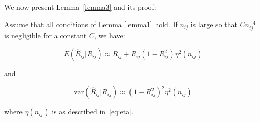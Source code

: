 



We now present Lemma~\ref{lemma3} and its proof:
\begin{lemma}\label{lemma3}
Assume that all conditions of Lemma \ref{lemma1} hold. If $n_{ij}$ is large so that $C n^{-4}_{ij}$ is negligible for a constant $C$, we have:

\begin{equation}
    E \left(\hat{R}_{ij} | R_{ij} \right) \approx R_{ij} + R_{ij} (1 - R^2_{ij}) \eta^2 (n_{ij})
\end{equation}

and 

\begin{equation}
    \text{var} \left(\hat{R}_{ij}| R_{ij} \right) \approx  (1 - R^2_{ij})^2 \eta^2 (n_{ij})
\end{equation}

where $\eta(n_{ij})$ is as described in~\eqref{eq:eta}.

\end{lemma}


